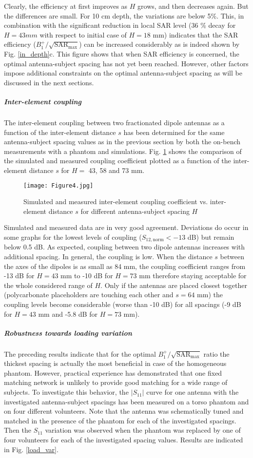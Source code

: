 \documentclass[fleqn,10pt]{wlscirep}
\begin{document}
%
Clearly, the efficiency at first improves as $H$ grows, and then decreases again. But the differences are small. For 10 cm depth, the variations are below 5\%. This, in combination with the significant reduction in local SAR level (36 \% decay for $H=43 mm$ with respect to initial case of $H=18$ mm) indicates that the SAR efficiency ($B_1^{+}/\sqrt{\text{SAR}_{\text{max}}}$) can be increased considerably as is indeed shown by Fig. \ref{in_depth}c. This figure shows that when SAR efficiency is concerned, the optimal antenna-subject spacing has not yet been reached. However, other factors impose additional constraints on the optimal antenna-subject spacing as will be discussed in the next sections. 

\subparagraph*{Inter-element coupling}

The inter-element coupling between two fractionated dipole antennas as a function of the inter-element distance $s$ has been determined for the same antenna-subject spacing values as in the previous section by both the on-bench measurements with a phantom and simulations. Fig. \ref{coupling} shows the comparison of the simulated and measured coupling coefficient plotted as a function of the inter-element distance $s$ for $H=$ 43, 58 and 73 mm. 
%
\begin{figure}
\center
\texttt{[image: Figure4.jpg]}
\caption{Simulated and measured inter-element coupling coefficient vs. inter-element distance $s$ for different antenna-subject spacing $H$}
\label{coupling}
\end{figure}
%
Simulated and measured data are in very good agreement. Deviations do occur in some graphs for the lowest levels of coupling ($S_{12,\text{norm}}<-13$ dB) but remain below 0.5 dB. 
As expected, coupling between two dipole antennas increases with additional spacing. In general, the coupling is low. When the distance $s$ between the axes of the dipoles is as small as 84 mm, the coupling coefficient ranges from -13 dB for $H=43$ mm to -10 dB for $H=73$ mm therefore staying acceptable for the whole considered range of $H$. Only if the antennas are placed closest together (polycarbonate placeholders are touching each other and $s=64$ mm) the coupling levels become considerable (worse than -10 dB) for all spacings (-9 dB for $H=43$ mm and -5.8 dB for $H=73$ mm). 

\subparagraph*{Robustness towards loading variation}

The preceding results indicate that for the optimal $B_1^{+}/\sqrt{\text{SAR}_{\text{max}}}$ ratio the thickest spacing is actually the most beneficial in case of the homogeneous phantom. However, practical experience has demonstrated that one fixed matching network is unlikely to provide good matching for a wide range of subjects. To investigate this behavior, the $|S_{11}|$ curve for one antenna with the investigated antenna-subject spacings has been measured on a torso phantom and on four different volunteers. Note that the antenna was schematically tuned and matched in the presence of the phantom for each of the investigated spacings. Then the $S_{11}$ variation was observed when the phantom was replaced by one of four volunteers for each of the investigated spacing values. Results are indicated in Fig. \ref{load_var}.
\end{document}
